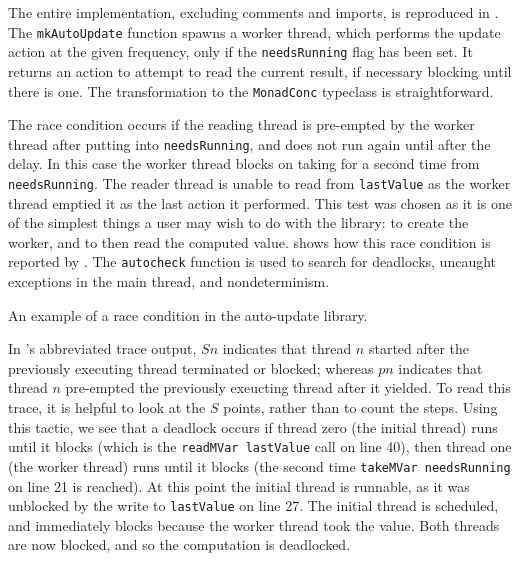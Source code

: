 The entire implementation, excluding comments and imports, is
reproduced in .  The \verb|mkAutoUpdate|
function spawns a worker thread, which performs the update action at
the given frequency, only if the \verb|needsRunning| flag has been
set.  It returns an action to attempt to read the current result, if
necessary blocking until there is one.  The transformation to the
\verb|MonadConc| typeclass is straightforward.

The race condition occurs if the reading thread is pre-empted by the
worker thread after putting into \verb|needsRunning|, and does not run
again until after the delay.  In this case the worker thread blocks on
taking for a second time from \verb|needsRunning|.  The reader thread
is unable to read from \verb|lastValue| as the worker thread emptied
it as the last action it performed.  This test was chosen as it is one
of the simplest things a user may wish to do with the library: to
create the worker, and to then read the computed value.
 shows how this race condition is
reported by \dejafu{}.  The \verb|autocheck| function is used to
search for deadlocks, uncaught exceptions in the main thread, and
nondeterminism.

\FloatBarrier

\begin{listing}
\centering
{}
\caption{An example of a race condition in the auto-update library.}\label{lst:example-autoupdate1}
\end{listing}

In \dejafu{}'s abbreviated trace output,
$Sn$ indicates that thread
$n$ started after the previously executing thread terminated or
blocked; whereas $pn$ indicates that thread
$n$ pre-empted the previously exeucting thread after it yielded.  To
read this trace, it is helpful to look at the
$S$ points, rather than to count the steps.  Using this tactic, we see
that a deadlock occurs if thread zero (the initial thread) runs until
it blocks (which is the \verb|readMVar lastValue| call on line 40),
then thread one (the worker thread) runs until it blocks (the second
time \verb|takeMVar needsRunning| on line 21 is reached).  At this
point the initial thread is runnable, as it was unblocked by the write
to \verb|lastValue| on line 27.  The initial thread is scheduled, and
immediately blocks because the worker thread took the value.  Both
threads are now blocked, and so the computation is deadlocked.


